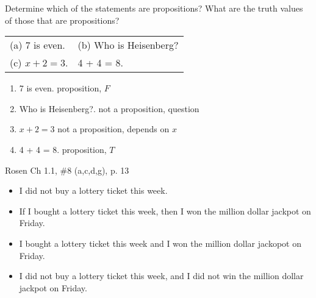 \documentclass[11pt,addpoints]{exam}
\begin{document}
\begin{questions}
\printanswers


\question[4] Determine which of the statements are propositions? What are the truth values of those that are propositions?
    \begin{tabular}{ll}
        (a) 7 is even.  \hspace{1in}    & (b) Who is Heisenberg? \\
        (c) $x + 2 = 3.$                & 4 + 4 = 8.
    \end{tabular}
    \ifprintanswers
        \vspace{-5pt}
    \fi
    \begin{solution}
        \begin{enumerate}[label=(\alph*),itemsep=0pt,parsep=0pt,
        topsep=0pt,partopsep=0pt]
        	\item 7 is even. \hspace{1.6in} proposition, $F$
        	\item Who is Heisenberg?. \hspace{0.80in} not a proposition, question
        	\item $x + 2 = 3$ \hspace{1.6in} not a proposition, depends on $x$
        	\item 4 + 4 = 8. \hspace{1.5in} proposition, $T$
        \end{enumerate}
    \end{solution}


\question[8] Rosen Ch 1.1, \#8 (a,c,d,g), p. 13 
	\ifprintanswers
        \vspace{-15pt}
    \fi
    \begin{solution}
    	\begin{itemize}[itemsep=0pt,parsep=0pt,
    	topsep=0pt,partopsep=0pt]
    		\item[(a)] I did not buy a lottery ticket this week.
    		\item[(c)] If I bought a lottery ticket this week, then I won the million dollar jackpot on Friday. 
    		\item[(d)] I bought a lottery ticket this week and I won the million dollar jackopot on Friday.
    		\item[(g)] I did not buy a lottery ticket this week, and I did not win the million dollar jackpot on Friday. 
    	\end{itemize}
    \end{solution}



\end{questions}
\end{document}
